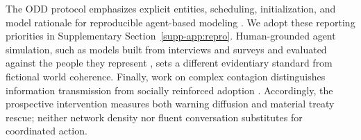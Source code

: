 The ODD protocol emphasizes explicit entities, scheduling, initialization, and
model rationale for reproducible agent-based modeling \cite{odd}. We adopt
these reporting priorities in Supplementary Section~\ref{supp-app:repro}. Human-grounded agent
simulation, such as models built from interviews and surveys and evaluated
against the people they represent \cite{park1000}, sets a different evidentiary standard from fictional
world coherence. Finally, work on complex contagion distinguishes information
transmission from socially reinforced adoption \cite{centola}. Accordingly,
the prospective intervention measures both warning diffusion and material
treaty rescue; neither network density nor fluent conversation substitutes
for coordinated action.
